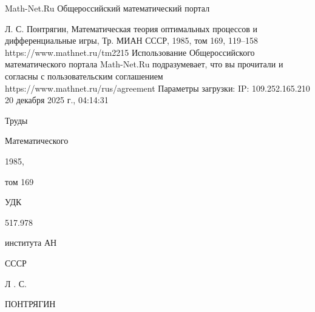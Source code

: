 \documentclass[10pt]{article}
\begin{document}
Math-Net.Ru
Общероссийский математический портал

Л. С. Понтрягин, Математическая теория оптимальных
процессов и дифференциальные игры,
Тр. МИАН СССР, 1985, том 169, 119--158
https://www.mathnet.ru/tm2215
Использование Общероссийского математического портала Math-Net.Ru подразумевает, что вы прочитали и согласны с пользовательским соглашением
https://www.mathnet.ru/rus/agreement
Параметры загрузки:
IP: 109.252.165.210
20 декабря 2025 г., 04:14:31

Труды

Математического

1985,

том 169

УДК

517.978

института АН

СССР

Л . С.

ПОНТРЯГИН
\end{document}
